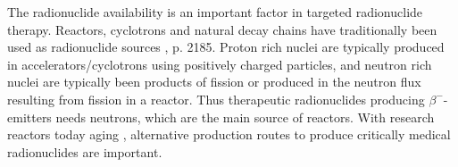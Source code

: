 The radionuclide availability is an important factor in targeted radionuclide therapy. Reactors, cyclotrons and natural decay chains have traditionally been used as radionuclide sources \cite{Vertes2011a}, p. 2185. Proton rich nuclei are typically produced in accelerators/cyclotrons using positively charged particles, and neutron rich nuclei are typically been products of fission or produced in the neutron flux resulting from fission in a reactor. Thus therapeutic radionuclides producing $\beta^-$-emitters needs neutrons, which are the main source of reactors. With research reactors today aging \cite{Yeong2014a}, alternative production routes to produce critically medical radionuclides are important. \\

